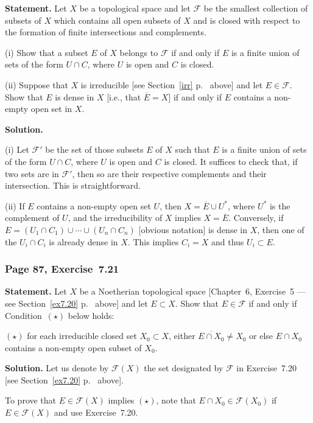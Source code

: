 \documentclass[12pt,letterpaper]{article}%
\newcommand{\nn}{\noindent}
\begin{document}
\textbf{Statement.} Let $X$ be a topological space and let $\mathcal F$ be the smallest collection of subsets of $X$ which contains all open subsets of $X$ and is closed with respect to the formation of finite intersections and complements.

\nn(i) Show that a subset $E$ of $X$ belongs to $\mathcal F$ if and only if $E$ is a finite union of sets of the form $U\cap C$, where $U$ is open and $C$ is closed.

\nn(ii) Suppose that $X$ is irreducible [see Section~\ref{irr} p.~\pageref{irr} above] and let $E\in\mathcal F$. Show that $E$ is dense in $X$ [i.e., that $\overline E=X$] if and only if $E$ contains a non-empty open set in $X$. 

\nn\textbf{Solution.}

\nn(i) Let $\mathcal F'$ be the set of those subsets $E$ of $X$ such that $E$ is a finite union of sets of the form $U\cap C$, where $U$ is open and $C$ is closed. It suffices to check that, if two sets are in $\mathcal F'$, then so are their respective complements and their intersection. This is straightforward. 

\nn(ii) If $E$ contains a non-empty open set $U$, then $X=\overline E\cup U^*$, where $U^*$ is the complement of $U$, and the irreducibility of $X$ implies $X=\overline E$. Conversely, if $E=(U_1\cap C_1)\cup\cdots\cup(U_n\cap C_n)$ [obvious notation] is dense in $X$, then one of the $U_i\cap C_i$ is already dense in $X$. This implies $C_i=X$ and thus $U_i\subset E$.

\subsubsection{Page 87, Exercise~7.21}\label{ex7.21}%

\textbf{Statement.} Let $X$ be a Noetherian topological space [Chapter~6, Exercise~5 --- see Section~\ref{ex7.20} p.~\pageref{ex7.20} above] and let $E\subset X$. Show that $E\in\mathcal F$ if and only if Condition~$(\star)$ below holds: 

\nn$(\star)$ for each irreducible closed set $X_0\subset X$, either $\overline{E\cap X_0}\ne X_0$ or else $E\cap X_0$ contains a non-empty open subset of $X_0$. 

\nn\textbf{Solution.} Let us denote by $\mathcal F(X)$ the set designated by $\mathcal F$ in Exercise~7.20 [see Section~\ref{ex7.20} p.~\pageref{ex7.20} above]. 

To prove that $E\in\mathcal F(X)$ implies $(\star)$, note that $E\cap X_0\in\mathcal F(X_0)$ if $E\in\mathcal F(X)$ and use Exercise~7.20.%
\end{document}
